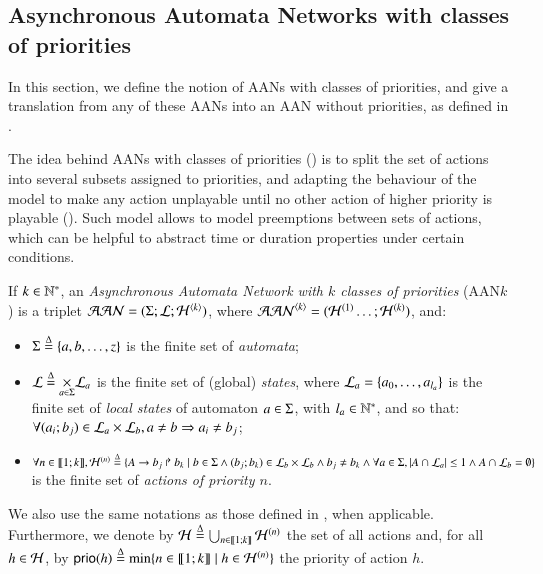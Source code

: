 \subsection{Asynchronous Automata Networks with classes of priorities}
\label{ssec:flattening}

In this section, we define the notion of AANs with classes of priorities,
and give a translation from any of these AANs into
an AAN without priorities, as defined in .

The idea behind AANs with classes of priorities ()
is to split the set of actions into several subsets assigned to priorities,
and adapting the behaviour of the model to make any action unplayable
until no other action of higher priority is playable ().
Such model allows to model preemptions between sets of actions,
which can be helpful to abstract time or duration properties under certain conditions.

\begin{definition}
\label{def:php}
  If $k \in \mathbb{N}^*$,
  an \emph{Asynchronous Automata Network with $k$ classes of priorities} (AAN$k$)
  is a triplet $\mathcal{AAN} = (\Sigma; \mathcal{L}; \mathcal{H}^{{\langle k \rangle}})$,
  where $\mathcal{AAN}^{{\langle k \rangle}} = (\mathcal{H}^{(1)} \dots; \mathcal{H}^{(k)})$,
  and:
  \begin{itemize}
    \item $\Sigma \stackrel{\Delta}= \{a, b, \dots, z\}$ is the finite set of \emph{automata};
    \item $\mathcal{L} \stackrel{\Delta}= \underset{a \in \Sigma}{\times} \mathcal{L}_a$ is the finite set of
      (global) \emph{states},
      where $\mathcal{L}_a = \{a_0, \ldots, a_{l_a}\}$ is the finite set of \emph{local states}
      of automaton $a \in \Sigma$, with $l_a \in \mathbb{N}^*$,
      and so that:
      $\forall (a_i; b_j) \in \mathcal{L}_a \times \mathcal{L}_b, a \neq b \Rightarrow a_i \neq b_j$;
    \item $\forall n \in \llbracket 1; k \rrbracket,
      \mathcal{H}^{(n)} \stackrel{\Delta}= \{A\rightarrow b_j\Rsh b_k \mid
      b \in \Sigma \wedge (b_j; b_k) \in \mathcal{L}_b \times \mathcal{L}_b \wedge
      b_j \neq b_k \wedge
      \forall a \in \Sigma, |A \cap \mathcal{L}_a| \leq 1 \wedge
      A \cap \mathcal{L}_b = \emptyset \}$ is the finite set of \emph{actions of priority $n$}.
  \end{itemize}
  We also use the same notations as those defined in , when applicable.
  Furthermore,
  we denote by $\mathcal{H} \stackrel{\Delta}= \bigcup_{n \in \llbracket 1; k \rrbracket} \mathcal{H}^{(n)}$ the set of all actions
  and, for all $h \in \mathcal{H}$,
  by $\mathsf{prio}(h) \stackrel{\Delta}= \min\{ n \in \llbracket 1; k \rrbracket \mid h \in \mathcal{H}^{(n)} \}$
  the priority of action $h$.
\end{definition}

